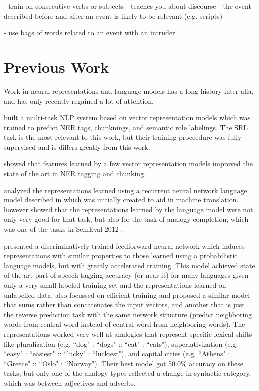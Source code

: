 \documentclass[11pt,letterpaper]{article}
\begin{document}
- train on consecutive verbs or subjects
	- teaches you about discourse
	- the event described before and after an event is likely to be relevant (e.g. scripts)

- use bags of words related to an event with an intruder




\section{Previous Work} %
Work in neural representations and language models has a long history
\cite{foundation1,foundation2,foundation3} inter alia,
and has only recently regained a lot of attention.


\cite{DBLP:conf/icml/CollobertW08} built a multi-task NLP system based
on vector representation models which was trained to predict NER tags,
chunknings, and semantic role labelings. The SRL task is the most relevant
to this work, but their training proceedure was fully supervised and
is differs greatly from this work.

\cite{turian} showed that features learned by
a few vector representation models improved the state of the art in NER tagging and chunking.


\cite{MikolovYZ13} analyzed the representations learned using
a recurrent neural network language model described in \cite{DBLP:conf/interspeech/KombrinkMKB11}
which was initially created to aid in machine translation.
\cite{MikolovYZ13} however showed that the representations learned by the
language model were not only very good for that task, but also for the
task of analogy completion, which was one of the tasks in SemEval 2012 \cite{semeval2012}.

\cite{rami} presented a discriminatively trained feedforward neural network
which induces representations with similar properties to those learned using
a probabilistic language models, but with greatly accelerated training.
This model achieved state of the art part of speech tagging accuracy (or near it)
for many languages given only a very small labeled training set and the representations
learned on unlabelled data.
\cite{DBLP:journals/corr/abs-1301-3781} also focussed on efficient training and
proposed a similar model that sums rather than concatenates the input vectors,
and another that is just the reverse prediction task with the same network structure
(predict neighboring words from central word instead of central word from neighboring words).
The representations worked very well at analogies that represent specific lexical shifts
like pluralization (e.g. ``dog" : ``dogs" :: ``cat" : ``cats"), superlativization
(e.g. ``easy" : ``easiest" :: ``lucky" : ``luckiest"), and
capital cities (e.g. ``Athens" : ``Greece" :: ``Oslo" : ``Norway").
Their best model got 50.0\% accuracy on these tasks, but only one of the analogy types
reflected a change in syntactic category, which was between adjectives and adverbs.
\end{document}
